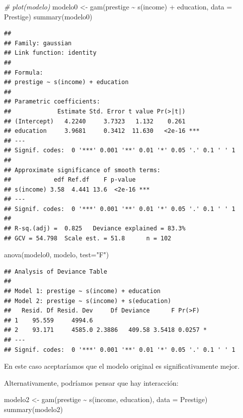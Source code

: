 \documentclass[
]{book}
\newenvironment{Shaded}{\begin{snugshade}}{\end{snugshade}}
\newcommand{\AttributeTok}[1]{\textcolor[rgb]{0.77,0.63,0.00}{#1}}
\newcommand{\CommentTok}[1]{\textcolor[rgb]{0.56,0.35,0.01}{\textit{#1}}}
\newcommand{\FunctionTok}[1]{\textcolor[rgb]{0.00,0.00,0.00}{#1}}
\newcommand{\NormalTok}[1]{#1}
\newcommand{\OtherTok}[1]{\textcolor[rgb]{0.56,0.35,0.01}{#1}}
\newcommand{\SpecialCharTok}[1]{\textcolor[rgb]{0.00,0.00,0.00}{#1}}
\newcommand{\StringTok}[1]{\textcolor[rgb]{0.31,0.60,0.02}{#1}}
\theoremstyle{break}
\begin{document}
\begin{Shaded}
\begin{Highlighting}[]
\CommentTok{\# plot(modelo)}
\NormalTok{modelo0 }\OtherTok{\textless{}{-}} \FunctionTok{gam}\NormalTok{(prestige }\SpecialCharTok{\textasciitilde{}} \FunctionTok{s}\NormalTok{(income) }\SpecialCharTok{+}\NormalTok{ education, }\AttributeTok{data =}\NormalTok{ Prestige)}
\FunctionTok{summary}\NormalTok{(modelo0)}
\end{Highlighting}
\end{Shaded}

\begin{verbatim}
## 
## Family: gaussian 
## Link function: identity 
## 
## Formula:
## prestige ~ s(income) + education
## 
## Parametric coefficients:
##             Estimate Std. Error t value Pr(>|t|)    
## (Intercept)   4.2240     3.7323   1.132    0.261    
## education     3.9681     0.3412  11.630   <2e-16 ***
## ---
## Signif. codes:  0 '***' 0.001 '**' 0.01 '*' 0.05 '.' 0.1 ' ' 1
## 
## Approximate significance of smooth terms:
##            edf Ref.df    F p-value    
## s(income) 3.58  4.441 13.6  <2e-16 ***
## ---
## Signif. codes:  0 '***' 0.001 '**' 0.01 '*' 0.05 '.' 0.1 ' ' 1
## 
## R-sq.(adj) =  0.825   Deviance explained = 83.3%
## GCV = 54.798  Scale est. = 51.8      n = 102
\end{verbatim}

\begin{Shaded}
\begin{Highlighting}[]
\FunctionTok{anova}\NormalTok{(modelo0, modelo, }\AttributeTok{test=}\StringTok{"F"}\NormalTok{)}
\end{Highlighting}
\end{Shaded}

\begin{verbatim}
## Analysis of Deviance Table
## 
## Model 1: prestige ~ s(income) + education
## Model 2: prestige ~ s(income) + s(education)
##   Resid. Df Resid. Dev     Df Deviance      F Pr(>F)  
## 1    95.559     4994.6                                
## 2    93.171     4585.0 2.3886   409.58 3.5418 0.0257 *
## ---
## Signif. codes:  0 '***' 0.001 '**' 0.01 '*' 0.05 '.' 0.1 ' ' 1
\end{verbatim}

En este caso aceptaríamos que el modelo original es significativamente mejor.

Alternativamente, podríamos pensar que hay interacción:

\begin{Shaded}
\begin{Highlighting}[]
\NormalTok{modelo2 }\OtherTok{\textless{}{-}} \FunctionTok{gam}\NormalTok{(prestige }\SpecialCharTok{\textasciitilde{}} \FunctionTok{s}\NormalTok{(income, education), }\AttributeTok{data =}\NormalTok{ Prestige)}
\FunctionTok{summary}\NormalTok{(modelo2)}
\end{Highlighting}
\end{Shaded}
\end{document}
